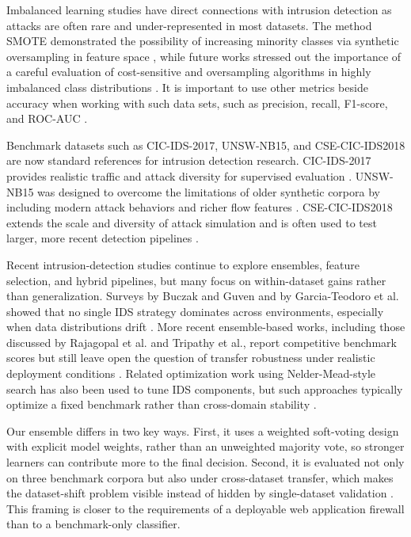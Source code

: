 \documentclass[conference]{IEEEtran}
\begin{document}
Imbalanced learning studies have direct connections with intrusion detection as attacks are often rare and under-represented in most datasets. The method SMOTE demonstrated the possibility of increasing minority classes via synthetic oversampling in feature space \cite{chawla2002smote}, while future works stressed out the importance of a careful evaluation of cost-sensitive and oversampling algorithms in highly imbalanced class distributions \cite{he2009learning}. It is important to use other metrics beside accuracy when working with such data sets, such as precision, recall, F1-score, and ROC-AUC \cite{sokolova2009systematic}.

Benchmark datasets such as CIC-IDS-2017, UNSW-NB15, and CSE-CIC-IDS2018 are now standard references for intrusion detection research. CIC-IDS-2017 provides realistic traffic and attack diversity for supervised evaluation \cite{sharafaldin2018toward2017}. UNSW-NB15 was designed to overcome the limitations of older synthetic corpora by including modern attack behaviors and richer flow features \cite{moustafa2015unsw}. CSE-CIC-IDS2018 extends the scale and diversity of attack simulation and is often used to test larger, more recent detection pipelines \cite{cic2018}.

Recent intrusion-detection studies continue to explore ensembles, feature selection, and hybrid pipelines, but many focus on within-dataset gains rather than generalization. Surveys by Buczak and Guven and by Garcia-Teodoro et al. showed that no single IDS strategy dominates across environments, especially when data distributions drift \cite{buczak2016survey,garciateodoro2009anomaly}. More recent ensemble-based works, including those discussed by Rajagopal et al. and Tripathy et al., report competitive benchmark scores but still leave open the question of transfer robustness under realistic deployment conditions \cite{rajagopal2023ensemble,tripathy2024intrusion}. Related optimization work using Nelder-Mead-style search has also been used to tune IDS components, but such approaches typically optimize a fixed benchmark rather than cross-domain stability \cite{neldermead2024optimization}.

Our ensemble differs in two key ways. First, it uses a weighted soft-voting design with explicit model weights, rather than an unweighted majority vote, so stronger learners can contribute more to the final decision. Second, it is evaluated not only on three benchmark corpora but also under cross-dataset transfer, which makes the dataset-shift problem visible instead of hidden by single-dataset validation \cite{dietterich2000ensemble,kuncheva2004combining}. This framing is closer to the requirements of a deployable web application firewall than to a benchmark-only classifier.
\end{document}

